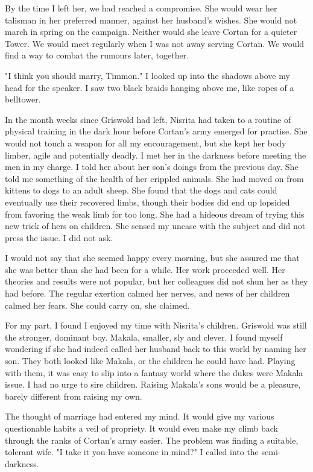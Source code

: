 \documentclass{article}
\begin{document}
By the time I left her, we had reached a compromise. She would wear her talisman in her preferred manner, against her husband's wishes. She would not march in spring on the campaign. Neither would she leave Cortan for a quieter Tower. We would meet regularly when I was not away serving Cortan. We would find a way to combat the rumours later, together.

\vspace{.5cm}

"I think you should marry, Timmon." I looked up into the shadows above my head for the speaker. I saw two black braids hanging above me, like ropes of a belltower. 

In the month weeks since Griswold had left, Nisrita had taken to a routine of physical training in the dark hour before Cortan's army emerged for practise. She would not touch a weapon for all my encouragement, but she kept her body limber, agile and potentially deadly. I met her in the darkness before meeting the men in my charge. I told her about her son's doings from the previous day. She told me something of the health of her crippled animals. She had moved on from kittens to dogs to an adult sheep. She found that the dogs and cats could eventually use their recovered limbs, though their bodies did end up lopsided from favoring the weak limb for too long. She had a hideous dream of trying this new trick of hers on children. She sensed my unease with the subject and did not press the issue. I did not ask.

I would not say that she seemed happy every morning, but she assured me that she was better than she had been for a while. Her work proceeded well. Her theories and results were not popular, but her colleagues did not shun her as they had before. The regular exertion calmed her nerves, and news of her children calmed her fears. She could carry on, she claimed.

For my part, I found I enjoyed my time with Nisrita's children. Griswold was still the stronger, dominant boy. Makala, smaller, sly and clever. I found myself wondering if she had indeed called her husband back to this world by naming her son. They both looked like Makala, or the children he could have had. Playing with them, it was easy to slip into a fantasy world where the dukes were Makala issue. I had no urge to sire children. Raising Makala's sons would be a pleasure, barely different from raising my own.

The thought of marriage had entered my mind. It would give my various questionable habits a veil of propriety. It would even make my climb back through the ranks of Cortan's army easier. The problem was finding a suitable, tolerant wife. "I take it you have someone in mind?" I called into the semi-darkness. 
\end{document}
